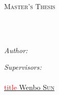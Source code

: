 \documentclass[
11pt, %
english, %
singlespacing, %
parskip, %
headsepline, %
dvipsnames]{misc/MastersDoctoralThesis} %
\author{Pepijn te \textsc{Marvelde}} %
\theoremstyle{definition}
\newcommand\todo[1]{\textcolor{red}{#1}}
\begin{document}
\frontmatter %

\pagestyle{plain} %


\begin{titlepage}
    \begin{center}

        \vspace*{.06\textheight}
        {\scshape\LARGE \univname\par}\vspace{1.5cm} %
        \textsc{\Large Master’s Thesis}\\[0.5cm] %

        \HRule \\[0.4cm] %
        {\huge \bfseries \ttitle\par}\vspace{0.4cm} %
        \HRule \\[1.5cm] %

        \begin{minipage}[t]{0.4\textwidth}
            \begin{flushleft} \large
                \emph{Author:}\\
                \authorname %
            \end{flushleft}
        \end{minipage}
        \begin{minipage}[t]{0.4\textwidth}
            \begin{flushright} \large
                \emph{Supervisors:} \\
                \href{https://www.wis.ewi.tudelft.nl/hai}{\supname}\\ %
                \href{https://www.wis.ewi.tudelft.nl/sun}{\todo{title} Wenbo \textsc{Sun}}
            \end{flushright}
        \end{minipage}\\[3cm]

        \vfill


\end{center}
\end{titlepage}
\end{document}
